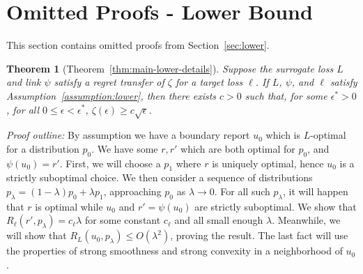 \documentclass{article}
\newtheorem*{theorem*}{Theorem}
\theoremstyle{definition}\newtheorem{definition}{Definition}
\theoremstyle{definition}\newtheorem{assumption}{Assumption}
\begin{document}
\section{Omitted Proofs - Lower Bound} \label{app:lower}
This section contains omitted proofs from Section~\ref{sec:lower}.

\begin{theorem*}[Theorem~\ref{thm:main-lower-details}]
  Suppose the surrogate loss $L$ and link $\psi$ satisfy a regret transfer of $\zeta$ for a target loss $\ell$.
  If $L$, $\psi$, and $\ell$ satisfy Assumption~\ref{assumption:lower}, then there exists $c > 0$ such that, for some $\epsilon^* > 0$, for all $0 \leq \epsilon < \epsilon^*$, $\zeta(\epsilon) \geq c \sqrt{\epsilon}$.
\end{theorem*}

\emph{Proof outline:} By assumption we have a boundary report $u_0$ which is $L$-optimal for a distribution $p_0$.
We have some $r,r'$ which are both optimal for $p_0$, and $\psi(u_0) = r'$.
First, we will choose a $p_1$ where $r$ is uniquely optimal, hence $u_0$ is a strictly suboptimal choice.
We then consider a sequence of distributions $p_{\lambda} = (1-\lambda) p_0 + \lambda p_1$, approaching $p_0$ as $\lambda \to 0$.
For all such $p_{\lambda}$, it will happen that $r$ is optimal while $u_0$ and $r' = \psi(u_0)$ are strictly suboptimal.
We show that $R_{\ell}(r', p_{\lambda}) = c_{\ell} \lambda$ for some constant $c_{\ell}$ and all small enough $\lambda$.
Meanwhile, we will show that $R_L(u_0, p_{\lambda}) \leq O(\lambda^2)$, proving the result.
The last fact will use the properties of strong smoothness and strong convexity in a neighborhood of $u_0$.
\end{document}

